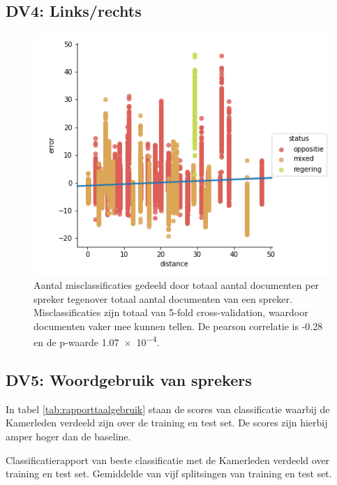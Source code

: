 \subsection{DV4: Links/rechts}
\begin{figure}[H]
  \centering
    \includegraphics[width=0.50\paperwidth]{Verslag/Tables/Ideology.png}
\caption{Aantal misclassificaties gedeeld door totaal aantal documenten per spreker tegenover totaal aantal documenten van een spreker. Misclassificaties zijn totaal van 5-fold cross-validation, waardoor documenten vaker mee kunnen tellen. De pearson correlatie is -0.28 en de p-waarde \num{1.07e-4}.}
\label{fig:misclassifiedsprekers}
\end{figure}

\subsection{DV5: Woordgebruik van sprekers}
In tabel \ref{tab:rapporttaalgebruik} staan de scores van classificatie waarbij de Kamerleden verdeeld zijn over de training en test set. De scores zijn hierbij amper hoger dan de baseline.
\begin{table}[H]
\caption{Classificatierapport van beste classificatie met de Kamerleden verdeeld over training en test set. Gemiddelde van vijf splitsingen van training en test set.}
\label{tab:rapporttaalgebruik}
\centering

\end{table}

